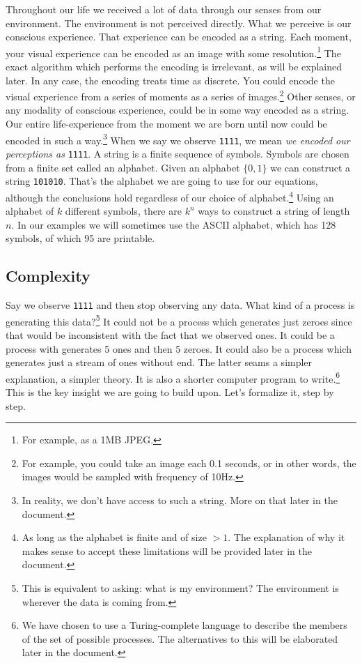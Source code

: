 Throughout our life we received a lot of data through our senses from our environment.
The environment is not perceived directly.
What we perceive is our conscious experience.
That experience can be encoded as a string.
Each moment, your visual experience can be encoded as an image with some resolution.\footnote{For example, as a 1MB JPEG.}
The exact algorithm which performs the encoding is irrelevant, as will be explained later.
In any case, the encoding treats time as discrete.
You could encode the visual experience from a series of moments as a series of images.\footnote{For example, you could take an image each 0.1 seconds, or in other words, the images would be sampled with frequency of 10Hz.}
Other senses, or any modality of conscious experience, could be in some way encoded as a string.
Our entire life-experience from the moment we are born until now could be encoded in such a way.\footnote{In reality, we don't have access to such a string. More on that later in the document.}
When we say we observe \texttt{1111}, we mean \textit{we encoded our perceptions as} \texttt{1111}.
A string is a finite sequence of symbols.
Symbols are chosen from a finite set called an alphabet.
Given an alphabet $\{0,1\}$ we can construct a string \texttt{101010}.
That's the alphabet we are going to use for our equations, although the conclusions hold regardless of our choice of alphabet.\footnote{As long as the alphabet is finite and of size $>1$. The explanation of why it makes sense to accept these limitations will be provided later in the document.}
Using an alphabet of $k$ different symbols, there are $k^n$ ways to construct a string of length $n$.
In our examples we will sometimes use the ASCII alphabet, which has 128 symbols, of which 95 are printable.

\newpage

\subsection{Complexity}

Say we observe \texttt{1111} and then stop observing any data.
What kind of a process is generating this data?\footnote{This is equivalent to asking: what is my environment? The environment is wherever the data is coming from.}
It could not be a process which generates just zeroes since that would be inconsistent with the fact that we observed ones.
It could be a process with generates 5 ones and then 5 zeroes.
It could also be a process which generates just a stream of ones without end.
The latter seams a simpler explanation, a simpler theory.
It is also a shorter computer program to write.\footnote{We have chosen to use a Turing-complete language to describe the members of the set of possible processes. The alternatives to this will be elaborated later in the document.}
This is the key insight we are going to build upon.
Let's formalize it, step by step.

